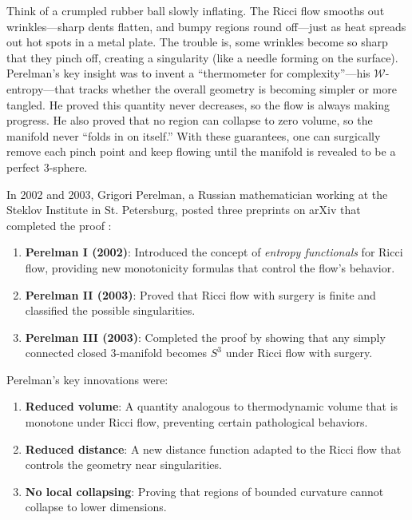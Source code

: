 Think of a crumpled rubber ball slowly inflating. The Ricci flow smooths out wrinkles---sharp dents flatten, and bumpy regions round off---just as heat spreads out hot spots in a metal plate. The trouble is, some wrinkles become so sharp that they pinch off, creating a singularity (like a needle forming on the surface). Perelman's key insight was to invent a ``thermometer for complexity''---his $\mathcal{W}$-entropy---that tracks whether the overall geometry is becoming simpler or more tangled. He proved this quantity never decreases, so the flow is always making progress. He also proved that no region can collapse to zero volume, so the manifold never ``folds in on itself.'' With these guarantees, one can surgically remove each pinch point and keep flowing until the manifold is revealed to be a perfect 3-sphere.

\bigskip

In 2002 and 2003, Grigori Perelman, a Russian mathematician working at the Steklov Institute in St. Petersburg, posted three preprints on arXiv that completed the proof \cite{perelman2002,perelman2003a,perelman2003b}:

\begin{enumerate}
\item \textbf{Perelman I (2002)}: Introduced the concept of \emph{entropy functionals} for Ricci flow, providing new monotonicity formulas that control the flow's behavior.
\item \textbf{Perelman II (2003)}: Proved that Ricci flow with surgery is finite and classified the possible singularities.
\item \textbf{Perelman III (2003)}: Completed the proof by showing that any simply connected closed 3-manifold becomes $S^3$ under Ricci flow with surgery.
\end{enumerate}

Perelman's key innovations were:

\begin{enumerate}
\item \textbf{Reduced volume}: A quantity analogous to thermodynamic volume that is monotone under Ricci flow, preventing certain pathological behaviors.
\item \textbf{Reduced distance}: A new distance function adapted to the Ricci flow that controls the geometry near singularities.
\item \textbf{No local collapsing}: Proving that regions of bounded curvature cannot collapse to lower dimensions.
\end{enumerate}

